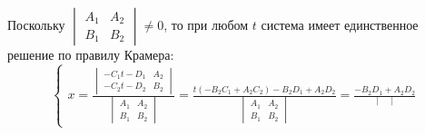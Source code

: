 \documentclass[a4paper]{article}
\begin{document}
\begin{hproof}
        Поскольку $\displaystyle \begin{vmatrix}
                                     A_1 & A_2 \\
                                     B_1 & B_2
        \end{vmatrix} \neq 0$, то при любом $t$ система имеет единственное решение по правилу Крамера: \begin{equation}
                                                                                                           \displaystyle
                                                                                                           \begin{cases}
                                                                                                               x=\frac{\begin{vmatrix}
                                                                                                                           -C_1t-D_1 & A_2 \\
                                                                                                                           -C_2t-D_2 & B_2
                                                                                                               \end{vmatrix}}{\begin{vmatrix}
                                                                                                                                  A_1 & A_2 \\
                                                                                                                                  B_1 & B_2
                                                                                                               \end{vmatrix}} = \frac{\displaystyle t(-B_2C_1+A_2C_2) - B_2D_1+A_2D_2}{\begin{vmatrix}
                                                                                                                                                                                           A_1 & A_2 \\
                                                                                                                                                                                           B_1 & B_2
                                                                                                               \end{vmatrix}} = \frac{\displaystyle -B_2D_1+A_2D_2}{\begin{vmatrix}

\end{vmatrix}}
\end{cases}
\end{equation}
\end{hproof}
\end{document}
